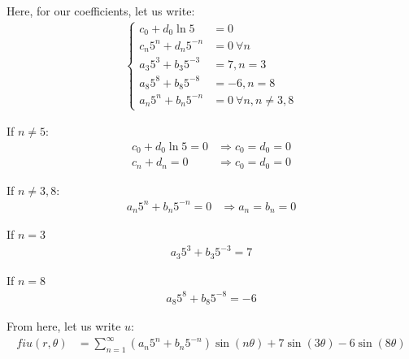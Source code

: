 \begin{enumerate}
  Here, for our coefficients, let us write:
  \begin{align}
    \begin{cases}
      c_0 + d_0 \ln 5 & = 0\\
      c_n 5^n + d_n 5^{-n} & = 0\ \forall n\\
      a_3 5^3 + b_3 5^{-3} & = 7, n = 3\\
      a_8 5^8 + b_8 5^{-8} & = -6, n = 8\\
      a_n 5^n + b_n 5^{-n} & = 0\ \forall n, n \neq 3, 8
    \end{cases}
  \end{align}

  If $n \neq 5$:
  \begin{align}
    c_0 + d_0 \ln 5 = 0 & \Rightarrow c_0 = d_0 = 0\\
    c_n + d_n = 0 & \Rightarrow c_0 = d_0 = 0
  \end{align}

  If $n \neq 3, 8$:
  \begin{align}
    a_n 5^n + b_n 5^{-n} = 0 & \Rightarrow a_n = b_n = 0
  \end{align}

  If $n = 3$
  \begin{align}
    a_3 5^3 + b_3 5^{-3} = 7
  \end{align}

  If $n = 8$
  \begin{align}
    a_8 5^8 + b_8 5^{-8} = -6
  \end{align}

  From here, let us write $u$:
  \begin{align}fi
    u(r, \theta) & = \sum^\infty_{n = 1}
    (a_n 5^n + b_n 5^{-n}) \sin(n \theta) +
    7 \sin(3 \theta) - 6 \sin(8 \theta)
  \end{align}
\end{enumerate}
